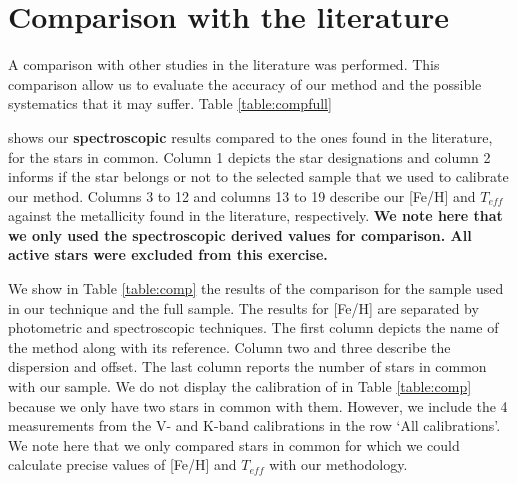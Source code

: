 \documentclass[referee]{aa}
\begin{document}
\section{Comparison with the literature}
\label{sec:comp}
A comparison with other studies in the literature was performed. This comparison allow us to evaluate the accuracy of our method and the possible systematics that it may suffer. Table \ref{table:compfull} \addtocounter{table}{1} shows our \textbf{spectroscopic} results compared to the ones found in the literature, for the stars in common. Column 1 depicts the star designations and column 2 informs if the star belongs or not to the selected sample that we used to calibrate our method. Columns 3 to 12 and columns 13 to 19 describe our [Fe/H] and $T_{eff}$ against the metallicity found in the literature, respectively. \textbf{We note here that we only used the spectroscopic derived values for comparison. All active stars were excluded from this exercise.}

We show in Table \ref{table:comp} the results of the comparison for the sample used in our technique and the full sample. The results for [Fe/H] are separated by photometric and spectroscopic techniques. The first column depicts the name of the method along with its reference. Column two and three describe the dispersion and offset. The last column reports the number of stars in common with our sample. We do not display the calibration of \citet{Mann-2013a} in Table \ref{table:comp} because we only have two stars in common with them. However, we include the 4 measurements from the V- and K-band calibrations in the row `All calibrations'. We note here that we only compared stars in common for which we could calculate precise values of [Fe/H] and $T_{eff}$ with our methodology.
\end{document}
